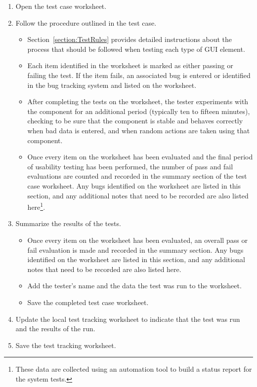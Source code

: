 \begin{enumerate}
\item Open the test case worksheet.
\item Follow the procedure outlined in the test case.
\begin{itemize}
\item Section~\ref{section:TestRules} provides detailed instructions about the process that should
be followed when testing each type of GUI element.
\item Each item identified in the worksheet is marked as either passing or failing the test.  If
the item fails, an associated bug is entered or identified in the bug tracking system and listed on
the worksheet.
\item After completing the tests on the worksheet, the tester experiments with the component for an
additional period (typically ten to fifteen minutes), checking to be sure that the component is
stable and behaves correctly when bad data is entered, and when random actions are taken using that
component.
\item Once every item on the worksheet has been evaluated and the final period of usability testing
has been performed, the number of pass and fail evaluations are counted and recorded in the
summary section of the test case worksheet. Any bugs identified on the worksheet are listed in this
section, and any additional notes that need to be recorded are also listed here\footnote{These data
are collected using an automation tool to build a status report for the system tests.}.
\end{itemize}
\item Summarize the results of the tests.
\begin{itemize}
\item Once every item on the worksheet has been evaluated, an overall pass or fail evaluation is
made and recorded in the summary section.  Any bugs identified on the worksheet are listed in this
section, and any additional notes that need to be recorded are also listed here.
\item Add the tester's name and the data the test was run to the worksheet.
\item Save the completed test case worksheet.
\end{itemize}
\item Update the local test tracking worksheet to indicate that the test was run and the results of
the run.
\item Save the test tracking worksheet.
\end{enumerate}

